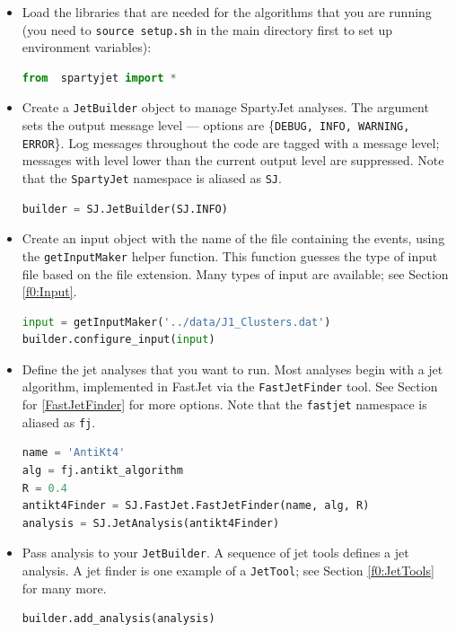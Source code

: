 \documentclass{article}
\newcommand{\prog}[1]{{\sc #1}\xspace}
\newcommand{\code}[1]{{\tt #1}\xspace}
\newcommand{\SJ}[0]{\prog{SpartyJet}}
\newcommand{\FJ}[0]{\prog{FastJet}}
\begin{document}
\begin{itemize}
\item Load the libraries that are needed for the algorithms that you are running (you need to \code{source setup.sh} in the main directory first to set up environment variables):
\begin{lstlisting}[language=Python]
from  spartyjet import *
\end{lstlisting}

\item Create a \code{JetBuilder} object to manage \SJ analyses. The argument sets the output message level --- options are \{\code{DEBUG, INFO, WARNING, ERROR}\!\!\}.  Log messages throughout the code are tagged with a message level; messages with level lower than the current output level are suppressed.  Note that the \code{SpartyJet} namespace is aliased as \code{SJ}.
\begin{lstlisting}[language=Python]
builder = SJ.JetBuilder(SJ.INFO)
\end{lstlisting}

\item Create an input object with the name of the file containing the events, using the \code{getInputMaker} helper function.  This function guesses the type of input file based on the file extension.  Many types of input are available; see Section \ref{f0:Input}.
\begin{lstlisting}[language=Python]
input = getInputMaker('../data/J1_Clusters.dat')
builder.configure_input(input)
\end{lstlisting}

\item  Define the jet analyses that you want to run.  Most analyses begin with a jet algorithm, implemented in \FJ via the \code{FastJetFinder} tool.  See Section for \ref{FastJetFinder} for more options.  Note that the \code{fastjet} namespace is aliased as \code{fj}.
\begin{lstlisting}[language=Python]
name = 'AntiKt4'
alg = fj.antikt_algorithm
R = 0.4
antikt4Finder = SJ.FastJet.FastJetFinder(name, alg, R)
analysis = SJ.JetAnalysis(antikt4Finder)
\end{lstlisting}
 
\item  Pass analysis to your \code{JetBuilder}.   A sequence of jet tools defines a jet analysis.   A jet finder is one example of a \code{JetTool}; see Section \ref{f0:JetTools} for many more.
\begin{lstlisting}[language=Python]
builder.add_analysis(analysis)
\end{lstlisting}
 

\end{itemize}
\end{document}
